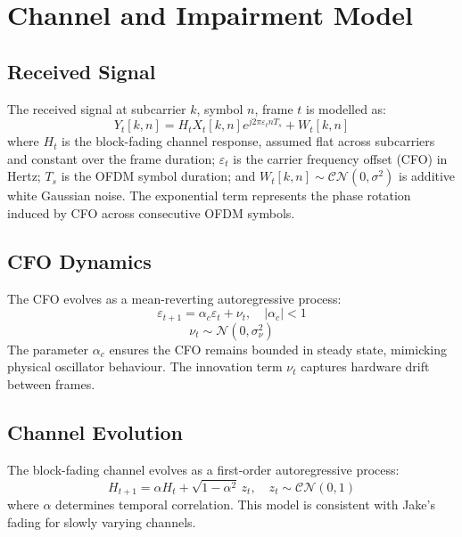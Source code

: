 \section{Channel and Impairment Model}

\subsection{Received Signal}

The received signal at subcarrier $k$, symbol $n$, frame $t$ is modelled as:
\begin{equation}
    Y_t[k,n] = H_t X_t[k,n] e^{j2\pi\varepsilon_t n T_s} + W_t[k,n]
    \label{eq:rx_signal}
\end{equation}
where $H_t$ is the block-fading channel response, assumed flat across subcarriers and constant over the frame duration; $\varepsilon_t$ is the carrier frequency offset (CFO) in Hertz; $T_s$ is the OFDM symbol duration; and $W_t[k,n] \sim \mathcal{CN}(0,\sigma^2)$ is additive white Gaussian noise. The exponential term represents the phase rotation induced by CFO across consecutive OFDM symbols.

\subsection{CFO Dynamics}

The CFO evolves as a mean-reverting autoregressive process:
\begin{equation}
    \varepsilon_{t+1} = \alpha_c \varepsilon_t + \nu_t, \quad |\alpha_c| < 1
    \label{eq:cfo_dynamics}
\end{equation}
\begin{equation}
    \nu_t \sim \mathcal{N}(0, \sigma_\nu^2)
    \label{eq:cfo_noise}
\end{equation}
The parameter $\alpha_c$ ensures the CFO remains bounded in steady state, mimicking physical oscillator behaviour. The innovation term $\nu_t$ captures hardware drift between frames.

\subsection{Channel Evolution}

The block-fading channel evolves as a first-order autoregressive process:
\begin{equation}
    H_{t+1} = \alpha H_t + \sqrt{1-\alpha^2}\, z_t, \quad z_t \sim \mathcal{CN}(0,1)
    \label{eq:channel_dynamics}
\end{equation}
where $\alpha$ determines temporal correlation. This model is consistent with Jake's fading for slowly varying channels.

